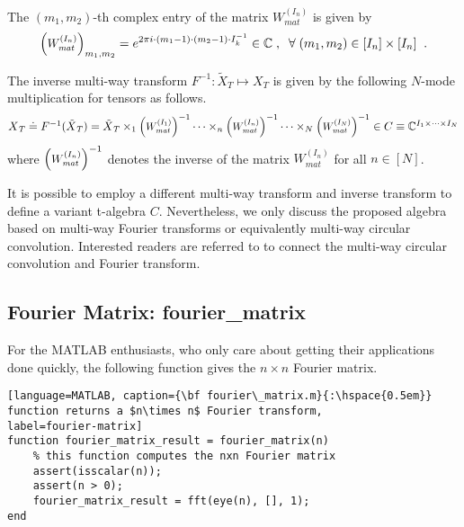 \documentclass[12pt,reqno]{amsart}
\numberwithin{equation}{section}
\numberwithin{figure}{section}
\numberwithin{table}{section}
\theoremstyle{definition}
\begin{document}
The $(m_1, m_2)$-th 
complex entry of the matrix $W_\mathit{mat}^{(I_n)}$ is given by
\begin{equation}
\left( \scalebox{0.92}{$W_\mathit{mat}^{(I_n)}$}  \right)_{m_1, m_2} = e^{2\pi i
\cdot (m_1 - 1) \cdot (m_2 - 1) \cdot I_{k}^{-1}  } 
\in \mathbb{C}
\;,\;\; \forall\; (m_1, m_2) \in [I_n] \times [I_n] \;\;. 
\label{equation:entri-fourier-matrix}
\end{equation}


The inverse multi-way transform $F^{-1}: \tilde{X}_\mathit{T} \mapsto X_\mathit{T}$
is given by the following $N$-mode multiplication for tensors as follows. 
\begin{equation}
\scalebox{0.9}{$
X_\mathit{T} \doteq F^{-1}(\tilde{X}_\mathit{T}) =  \tilde{X}_\mathit{T} \times_1 
\left( \scalebox{0.92}{$W_\mathit{mat}^{(I_1)}$}   \right)^{-1} \cdots \times_n 
\left( \scalebox{0.92}{$W_\mathit{mat}^{(I_n)}$} \right)^{-1} 
\cdots  \times_N \left( \scalebox{0.92}{$W_\mathit{mat}^{(I_N)}$} \right)^{-1}
\in C \equiv \mathbb{C}^{I_1\times \cdots \times I_N}
$}
\label{equation:inverse-fourier-transform-tscalar}
\end{equation}
where $\left(\scalebox{0.92}{$W_\mathit{mat}^{(I_n)}$} \right)^{-1}$ denotes  
the inverse of the matrix 
$W_\mathit{mat}^{(I_n)} $ for all $n \in [N]$. 


It is possible to employ a different multi-way transform and inverse transform to define a variant t-algebra $C$. 
Nevertheless, we only discuss the proposed algebra based on multi-way Fourier transforms or equivalently multi-way circular convolution. Interested readers are referred to \cite{liao2020general,liao2020generalized} to connect the multi-way circular convolution and Fourier transform.


\subsection{{\color{blue} \sc Fourier Matrix}: {\color{blue}fourier\_matrix}}
For the MATLAB enthusiasts, who only care about getting their applications done quickly, the following function gives the $n\times n$ Fourier matrix. 
\begin{lstlisting}[language=MATLAB, caption={\bf fourier\_matrix.m}{:\hspace{0.5em}} 
function returns a $n\times n$ Fourier transform, 
label=fourier-matrix] 
function fourier_matrix_result = fourier_matrix(n)
	% this function computes the nxn Fourier matrix 
	assert(isscalar(n));
	assert(n > 0);
	fourier_matrix_result = fft(eye(n), [], 1);
end
\end{lstlisting} 
\end{document}
